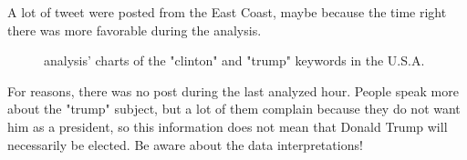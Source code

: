 \documentclass[a4paper,11pt]{report}
\begin{document}
A lot of tweet were posted from the East Coast, maybe because the time right there was more favorable during the analysis.
\begin{figure}[H]
\vspace{-5pt}
\begin{center}
\vspace{-20pt}
\caption{analysis' charts of the "clinton" and "trump" keywords in the U.S.A.}
\end{center}
\end{figure}

For reasons, there was no post during the last analyzed hour. People speak more about the "trump" subject, but a lot of them complain because they do not want him as a president, so this information does not mean that Donald Trump will necessarily be elected. Be aware about the data interpretations!
\newpage
\end{document}
